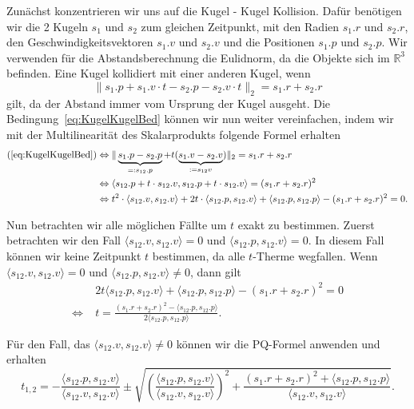 \documentclass[a4paper, 10pt, openright, parskip, chapterprefix]{scrreprt}
\begin{document}
\noindent Zunächst konzentrieren wir uns auf die Kugel - Kugel Kollision. Dafür benötigen wir die 2 Kugeln 
$s_1$ und $s_2$ zum gleichen Zeitpunkt, mit den Radien $s_1.r$ und $s_2.r$, den Geschwindigkeitsvektoren
$s_1.v$ und $s_2.v$ und die Positionen $s_1.p$ und $s_2.p$. Wir verwenden für die Abstandsberechnung die
Eulidnorm, da die Objekte sich im $\mathbb{R}^{3}$ befinden. Eine Kugel kollidiert mit einer anderen
Kugel, wenn 
\begin{equation}
    \label{eq:KugelKugelBed}
    \|s_1.p + s_1.v \cdot t - s_2.p - s_2.v \cdot t \|_{2} = s_1.r + s_2.r
\end{equation}
gilt, da der Abstand immer vom Ursprung der Kugel ausgeht.
Die Bedingung~\ref{eq:KugelKugelBed} können wir nun weiter vereinfachen, indem wir mit der Multilinearität des Skalarprodukts folgende Formel erhalten
\begin{align*}
(\ref{eq:KugelKugelBed})  &\Leftrightarrow \|\underbrace{s_1.p - s_2.p}_{=: s_{12}.p} + t (\underbrace{s_1.v - s_2.v}_{:=s_{12}v})\|_{2}  = s_1.r + s_2.r\\
&\Leftrightarrow \langle s_{12}.p + t \cdot s_{12}.v, s_{12}.p + t \cdot s_{12}.v\rangle = (s_1.r + s_2.r)^{2}\\
&\Leftrightarrow t^{2} \cdot \langle s_{12}.v, s_{12}.v\rangle + 2t \cdot \langle s_{12}.p, s_{12}.v\rangle + \langle s_{12}.p, s_{12}.p\rangle -(s_1.r+s_2.r)^{2} = 0 \text{.}
\end{align*}

\noindent Nun betrachten wir alle möglichen Fällte um $t$ exakt zu bestimmen. Zuerst betrachten wir den Fall $\langle s_{12}.v, s_{12}.v \rangle = 0$ und 
$\langle s_{12}.p, s_{12}.v \rangle = 0$. In diesem Fall können wir keine Zeitpunkt $t$ bestimmen, da alle $t$-Therme wegfallen. Wenn
$\langle s_{12}.v, s_{12}.v \rangle = 0$ und $\langle s_{12}.p, s_{12}.v\rangle \not= 0$, dann gilt
\begin{align*}
&2t \langle s_{12}.p, s_{12}.v\rangle + \langle s_{12}.p, s_{12}.p \rangle - (s_{1}.r + s_{2}.r)^{2} = 0 \\
\Leftrightarrow \; &t  = \frac{(s_{1}.r + s_{2}.r)^{2} - \langle s_{12}.p, s_{12}.p \rangle}{2 \langle s_{12}.p, s_{12}.p\rangle}\text{.}
\end{align*}

\noindent  Für den Fall, das $\langle s_{12}.v, s_{12}.v \rangle \not= 0$ können wir die PQ-Formel anwenden und erhalten
\begin{equation*}
t_{1, 2} = -\frac{\langle s_{12}.p, s_{12}.v\rangle}{\langle s_{12}.v, s_{12}.v \rangle} \pm \sqrt{ \left( \frac{\langle s_{12}.p, s_{12}.v\rangle}{\langle s_{12}.v, s_{12}.v \rangle} \right)^{2} + \frac{(s_{1}.r + s_{2}.r)^{2} + \langle s_{12}.p, s_{12}.p\rangle}{\langle s_{12}.v, s_{12}.v \rangle}}\text{.}
\end{equation*}
\end{document}
